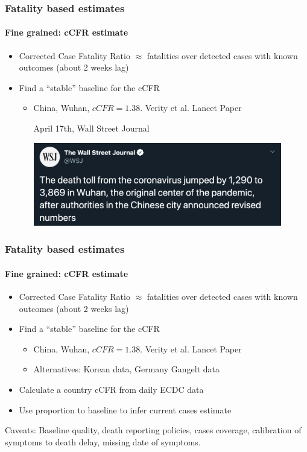 \documentclass{beamer}
\begin{document}
\begin{frame}
  \frametitle{Fatality based estimates}
  \framesubtitle{Fine grained: cCFR estimate}
  \begin{itemize}
    \item Corrected Case Fatality Ratio $\approx$ fatalities over detected cases with known outcomes (about 2 weeks lag)
    \item Find a ``stable'' baseline for the cCFR 
      \begin{itemize}
        \item China, Wuhan, $cCFR=1.38$.  Verity et al. Lancet Paper 
          \begin{block}{April 17th, Wall Street Journal}
          \begin{center}
          \includegraphics[width=0.9\textwidth]{WSJ.png}
          \end{center}
          \end{block}
      \end{itemize}
  \end{itemize}
\end{frame}

\begin{frame}
  \frametitle{Fatality based estimates}
  \framesubtitle{Fine grained: cCFR estimate}
  \begin{itemize}
    \item Corrected Case Fatality Ratio $\approx$ fatalities over detected cases with known outcomes (about 2 weeks lag)
    \item Find a ``stable'' baseline for the cCFR 
      \begin{itemize}
        \item China, Wuhan, $cCFR=1.38$.  Verity et al. Lancet Paper 
        \item Alternatives: Korean data, Germany Gangelt data
      \end{itemize}
    \item Calculate a country cCFR from daily ECDC data 
    \item Use proportion to baseline to infer current cases estimate
  \end{itemize} \pause

  Caveats: Baseline quality, death reporting policies, cases coverage, calibration of symptoms to death delay, missing date of symptoms.
\end{frame}
\end{document}
